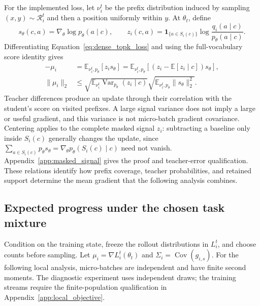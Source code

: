 For the implemented loss, let $\nu_i^t$ be the prefix distribution induced
by sampling $(x,y)\sim\mathcal R_i^t$ and then a position uniformly within
$y$. At $\theta_t$, define
\begin{equation}
    s_\theta(c,a)=\nabla_\theta\log p_\theta(a\mid c),\qquad
    z_i(c,a)=\mathbf1_{\{a\in S_i(c)\}}
                   \log\frac{q_i(a\mid c)}{p_\theta(a\mid c)}.
    \label{eq:masked_teacher_signal}
\end{equation}
Differentiating Equation~\ref{eq:dense_topk_loss} and using the
full-vocabulary score identity gives
\begin{equation}
\begin{split}
    -\mu_i
      &=\mathbb E_{\nu_i^t,p_\theta}[z_i s_\theta]
       =\mathbb E_{\nu_i^t,p_\theta}
          [(z_i-\mathbb E[z_i\mid c])s_\theta],\\
    \|\mu_i\|_2
      &\leq\sqrt{\mathbb E_{\nu_i^t}\operatorname{Var}_{p_\theta}
                      (z_i\mid c)}
             \sqrt{\mathbb E_{\nu_i^t,p_\theta}\|s_\theta\|_2^2}.
\end{split}
\label{eq:teacher_signal_projection}
\end{equation}
Teacher differences produce an update through their correlation with the
student's score on visited prefixes. A large signal variance does not
imply a large or useful gradient, and this variance is not micro-batch
gradient covariance. Centering applies to the complete masked signal $z_i$:
subtracting a baseline only inside $S_i(c)$ generally changes the update,
since $\sum_{a\in S_i(c)}p_\theta s_\theta=
\nabla_\theta p_\theta(S_i(c)\mid c)$ need not vanish.
Appendix~\ref{app:masked_signal} gives the proof and teacher-error
qualification. These relations identify how prefix coverage, teacher
probabilities, and retained support determine the mean gradient that
the following analysis combines.

\subsection{Expected progress under the chosen task mixture}

Condition on the training state, freeze the rollout distributions in
$L_i^t$, and choose counts before sampling. Let
$\mu_i=\nabla L_i^t(\theta_t)$ and
$\Sigma_i=\operatorname{Cov}(g_{i,s})$. For the following local analysis,
micro-batches are independent and have finite second moments. The
diagnostic experiment uses independent draws; the training streams require
the finite-population qualification in Appendix~\ref{app:local_objective}.

